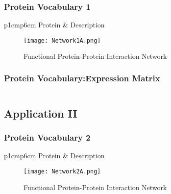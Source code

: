 \subsubsection{Protein Vocabulary 1}

\begin{table}[H]\tiny
\caption{Gene and Protein Annotations}	
	\begin{tabular}{p{1cm}p{6cm}}
		\hline
		Protein & Description \\   
		\hline
	\hline
\end{tabular}
\end{table}

\begin{figure}[H]
	\centering
	\begin{minipage}[b]{1\linewidth}
		\texttt{[image: Network1A.png]}
	\end{minipage}\hfill
	\caption{Functional Protein-Protein Interaction Network}
	\label{fig:Figure1}
\end{figure} 


\subsubsection{Protein Vocabulary:Expression Matrix}

\begin{equation}
\end{equation}

\subsection{Application II}

\subsubsection{Protein Vocabulary 2}

\begin{table}[H]\tiny
\caption{Gene and Protein Annotations}	
	\begin{tabular}{p{1cm}p{6cm}}
		\hline
		Protein & Description \\   
		\hline
	\hline
\end{tabular}
\end{table}

\begin{figure}[H]
	\centering
	\begin{minipage}[b]{1\linewidth}
		\texttt{[image: Network2A.png]}
	\end{minipage}\hfill
	\caption{Functional Protein-Protein Interaction Network}
	\label{fig:Figure1}
\end{figure} 


